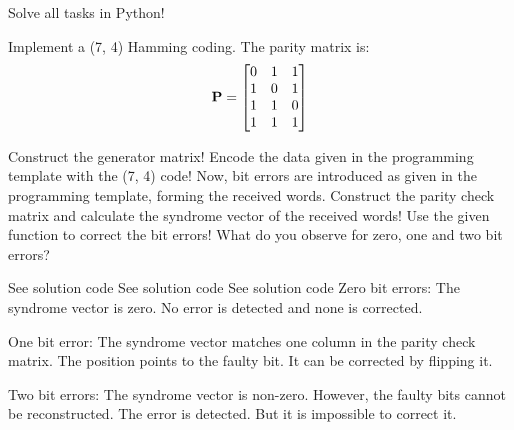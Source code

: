 \begin{question}[subtitle={Python Programming: Hamming Code}]
	Solve all tasks in Python!
	
	Implement a (7, 4) Hamming coding. The parity matrix is:
	\begin{equation*}
		\bm{\mathrm{P}} = \left[\begin{matrix}
			0 & 1 & 1 \\
			1 & 0 & 1 \\
			1 & 1 & 0 \\
			1 & 1 & 1
		\end{matrix}\right]
	\end{equation*}
	
	\begin{tasks}
		\task
		Construct the generator matrix!
		\task
		Encode the data given in the programming template with the (7, 4) code!
		\task
		Now, bit errors are introduced as given in the programming template, forming the received words. Construct the parity check matrix and calculate the syndrome vector of the received words! Use the given function to correct the bit errors!
		\task
		What do you observe for zero, one and two bit errors?
	\end{tasks}
\end{question}

\begin{solution}
	\begin{tasks}
		\task
		See solution code
		\task
		See solution code
		\task
		See solution code
		\task
		Zero bit errors: The syndrome vector is zero. No error is detected and none is corrected.
		
		One bit error: The syndrome vector matches one column in the parity check matrix. The position points to the faulty bit. It can be corrected by flipping it.
		
		Two bit errors: The syndrome vector is non-zero. However, the faulty bits cannot be reconstructed. The error is detected. But it is impossible to correct it.
	\end{tasks}
\end{solution}

%	
%
%	

